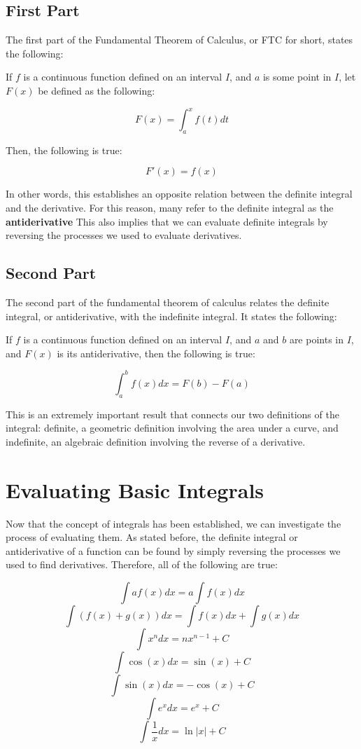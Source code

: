 \documentclass[11pt]{article}
\begin{document}
\subsection{First Part}
The first part of the Fundamental Theorem of Calculus, or FTC for short, states the following:


If $f$ is a continuous function defined on an interval $I$, and $a$ is some point in $I$, let $F(x)$ be defined as the following:

\[ F(x) = \int_{a}^{x} f(t) dt \]

Then, the following is true:

\[ F'(x) = f(x) \]

In other words, this establishes an opposite relation between the definite integral and the derivative. For this reason, many refer to the definite integral as the \textbf{antiderivative} This also implies that we can evaluate definite integrals by reversing the processes we used to evaluate derivatives.

\subsection{Second Part}
The second part of the fundamental theorem of calculus relates the definite integral, or antiderivative, with the indefinite integral. It states the following:

If $f$ is a continuous function defined on an interval $I$, and $a$ and $b$ are points in $I$, and $F(x)$ is its antiderivative, then the following is true:

\[ \int_{a}^{b} f(x) dx = F(b) - F(a) \]

This is an extremely important result that connects our two definitions of the integral: definite, a geometric definition involving the area under a curve, and indefinite, an algebraic definition involving the reverse of a derivative.

\section{Evaluating Basic Integrals}

Now that the concept of integrals has been established, we can investigate the process of evaluating them. As stated before, the definite integral or antiderivative of a function can be found by simply reversing the processes we used to find derivatives. Therefore, all of the following are true:

\[ \int af(x) dx = a \int f(x) dx \]
\[ \int (f(x) + g(x)) dx = \int f(x) dx + \int g(x) dx \]
\[ \int x^n dx = nx^{n-1}+C \]
\[ \int \cos(x) dx = \sin(x) + C\]
\[ \int \sin(x) dx = -\cos(x) + C\]
\[ \int e^x dx = e^x + C \]
\[ \int \frac{1}{x} dx = \ln|x| + C \]
\end{document}
